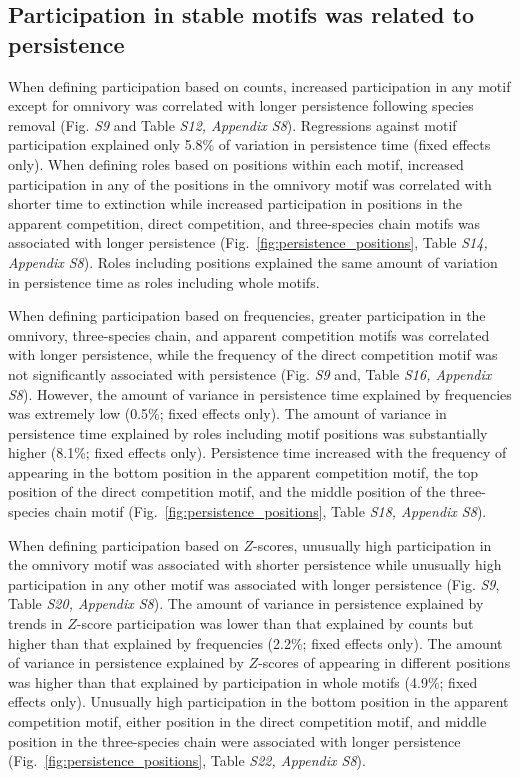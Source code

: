 \documentclass[12pt]{article}
\begin{document}
\begin{spacing}{2.0}
    \subsection*{Participation in stable motifs was related to persistence}
    
        When defining participation based on counts, increased participation in any motif except for omnivory was correlated with longer persistence following species removal (Fig. \emph{S9} and Table \emph{S12, Appendix S8}).
        Regressions against motif participation explained only 5.8\% of variation in persistence time (fixed effects only).
        When defining roles based on positions within each motif,  increased participation in any of the positions in the omnivory motif was correlated with shorter time to extinction while increased participation in positions in the apparent competition, direct competition, and three-species chain motifs was associated with longer persistence (Fig.~\ref{fig:persistence_positions}, Table \emph{S14, Appendix S8}).
        Roles including positions explained the same amount of variation in persistence time as roles including whole motifs.
        
        
        When defining participation based on frequencies, greater participation in the omnivory, three-species chain, and apparent competition motifs was correlated with longer persistence, while the frequency of the direct competition motif was not significantly associated with persistence (Fig. \emph{S9} and, Table \emph{S16, Appendix S8}).
        However, the amount of variance in persistence time explained by frequencies was extremely low (0.5\%; fixed effects only). 
        The amount of variance in persistence time explained by roles including motif positions was substantially higher (8.1\%; fixed effects only).
        Persistence time increased with the frequency of appearing in the bottom position in the apparent competition motif, the top position of the direct competition motif, and the middle position of the three-species chain motif (Fig.~\ref{fig:persistence_positions}, Table \emph{S18, Appendix S8}).

        
        When defining participation based on $Z$-scores, unusually high participation in the omnivory motif was associated with shorter persistence while unusually high participation in any other motif was associated with longer persistence (Fig. \emph{S9}, Table \emph{S20, Appendix S8}).
        The amount of variance in persistence explained by trends in $Z$-score participation was lower than that explained by counts but higher than that explained by frequencies (2.2\%; fixed effects only).
        The amount of variance in persistence explained by $Z$-scores of appearing in different positions was higher than that explained by participation in whole motifs (4.9\%; fixed effects only).
        Unusually high participation in the bottom position in the apparent competition motif, either position in the direct competition motif, and middle position in the three-species chain were associated with longer persistence (Fig.~\ref{fig:persistence_positions}, Table \emph{S22, Appendix S8}).



\end{spacing}
\end{document}

